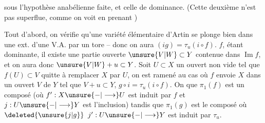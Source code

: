 sous l'hypothèse anabélienne faite, et celle de dominance. (Cette deuxième n'est pas superflue, comme on voit en prenant  )

Tout d'abord, on vérifie qu'une variété élémentaire d'Artin se plonge bien  dans une ext. d'une V.A. par un tore -- donc on aura $(ig)=\tau_u(i\circ f)$.    $f$, étant dominante, il existe une partie ouverte  $\unsure{V|W}\subset Y$ contenue dans $\operatorname{Im}f$, et on aura donc $\unsure{V|W}+u\subset Y$. Soit $U\subset X$ un ouvert non vide tel que $f(U)\subset V$   quitte à remplacer $X$ par $U$, on est ramené au cas où $f$ envoie $X$ dans un ouvert $V$ de $Y$ tel que $V+u\subset Y$,  $g\circ i=\tau_u(i\circ f)$. On   que $\pi_1(f)$ est un composé (où $f':X\unsure{-|\longrightarrow}U$ est  induit par $f$ et $j:U\unsure{-|\longrightarrow}Y$ est l'inclusion)
tandis que $\pi_1(g)$ est le composé
où $\deleted{\unsure{j|g}}$ $j':U\unsure{-|\longrightarrow}Y$ est induit par $\tau_u$.
